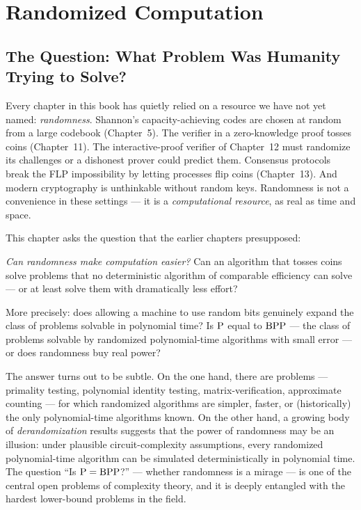 
\chapter{Randomized Computation}
\label{ch:randomized}

\section{The Question: What Problem Was Humanity Trying to Solve?}
\label{sec:randomized:question}

Every chapter in this book has quietly relied on a resource we have not yet named: \emph{randomness}. Shannon's capacity-achieving codes are chosen at random from a large codebook (Chapter~5). The verifier in a zero-knowledge proof tosses coins (Chapter~11). The interactive-proof verifier of Chapter~12 must randomize its challenges or a dishonest prover could predict them. Consensus protocols break the FLP impossibility by letting processes flip coins (Chapter~13). And modern cryptography is unthinkable without random keys. Randomness is not a convenience in these settings --- it is a \emph{computational resource}, as real as time and space.

This chapter asks the question that the earlier chapters presupposed:

\emph{Can randomness make computation easier?} Can an algorithm that tosses coins solve problems that no deterministic algorithm of comparable efficiency can solve --- or at least solve them with dramatically less effort?

More precisely: does allowing a machine to use random bits genuinely expand the class of problems solvable in polynomial time? Is $\text{P}$ equal to $\text{BPP}$ --- the class of problems solvable by randomized polynomial-time algorithms with small error --- or does randomness buy real power?

The answer turns out to be subtle. On the one hand, there are problems --- primality testing, polynomial identity testing, matrix-verification, approximate counting --- for which randomized algorithms are simpler, faster, or (historically) the only polynomial-time algorithms known. On the other hand, a growing body of \emph{derandomization} results suggests that the power of randomness may be an illusion: under plausible circuit-complexity assumptions, every randomized polynomial-time algorithm can be simulated deterministically in polynomial time. The question ``Is $\text{P} = \text{BPP}$?'' --- whether randomness is a mirage --- is one of the central open problems of complexity theory, and it is deeply entangled with the hardest lower-bound problems in the field.


